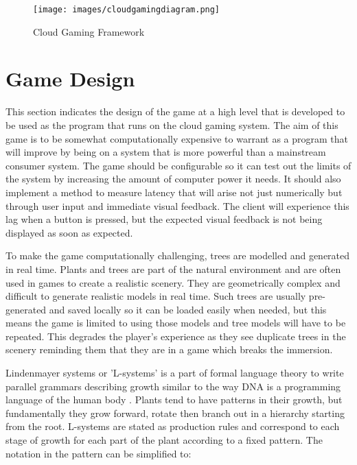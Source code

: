 \clearpage
\begin{figure}[h!]
 \centering
 \texttt{[image: images/cloudgamingdiagram.png]}
 \caption{Cloud Gaming Framework \cite{chuah2014cloud}}
 \label{fig:cloudframework}
\end{figure}

\section{Game Design}
This section indicates the design of the game at a high level that is developed to be used as the program that runs on the cloud gaming system. The aim of this game is to be somewhat computationally expensive to warrant as a program that will improve by being on a system that is more powerful than a mainstream consumer system. The game should be configurable so it can test out the limits of the system by increasing the amount of computer power it needs. It should also implement a method to measure latency that will arise not just numerically but through user input and immediate visual feedback. The client will experience this lag when a button is pressed, but the expected visual feedback is not being displayed as soon as expected.
\newline
\par
To make the game computationally challenging, trees are modelled and generated in real time. Plants and trees are part of the natural environment and are often used in games to create a realistic scenery. They are geometrically complex and difficult to generate realistic models in real time. Such trees are usually pre-generated and saved locally so it can be loaded easily when needed, but this means the game is limited to using those models and tree models will have to be repeated. This degrades the player's experience as they see duplicate trees in the scenery reminding them that they are in a game which breaks the immersion.
\newline
\par
Lindenmayer systems or 'L-systems' is a part of formal language theory to write parallel grammars describing growth similar to the way DNA is a programming language of the human body \cite{prusinkiewicz2012algorithmic}. Plants tend to have patterns in their growth, but fundamentally they grow forward, rotate then branch out in a hierarchy starting from the root. L-systems are stated as production rules and correspond to each stage of growth for each part of the plant according to a fixed pattern. The notation in the pattern can be simplified to:
